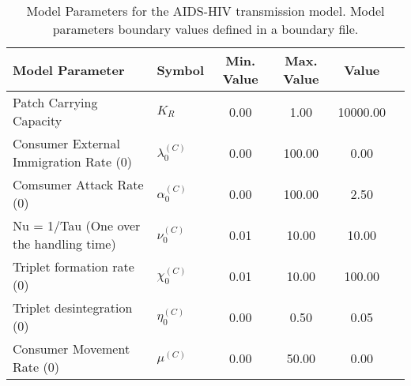\begin{table}
\centering
\begin{tabular}{p{5cm}lcccc}
{\bf Model Parameter} & {\bf Symbol} & {\bf Min. Value} & {\bf Max. Value} & {\bf Value}\\
\hline\hline
Patch Carrying Capacity & $K_R$ & 0.00 & 1.00 & 10000.00\\
Consumer External Immigration Rate (0) & $\lambda^{(C)}_0$ & 0.00 & 100.00 & 0.00\\
Comsumer Attack Rate (0) & $\alpha^{(C)}_0$ & 0.00 & 100.00 & 2.50\\
Nu = 1/Tau (One over the handling time) & $\nu^{(C)}_0$ & 0.01 & 10.00 & 10.00\\
Triplet formation rate (0) & $\chi^{(C)}_0$ & 0.01 & 10.00 & 100.00\\
Triplet desintegration (0) & $\eta^{(C)}_0$ & 0.00 & 0.50 & 0.05\\
Consumer Movement Rate (0) & $\mu^{(C)}$ & 0.00 & 50.00 & 0.00\\
\hline\hline
\end{tabular}
\caption{Model Parameters for the AIDS-HIV transmission model. Model parameters boundary values defined in a boundary file.}
\end{table}
